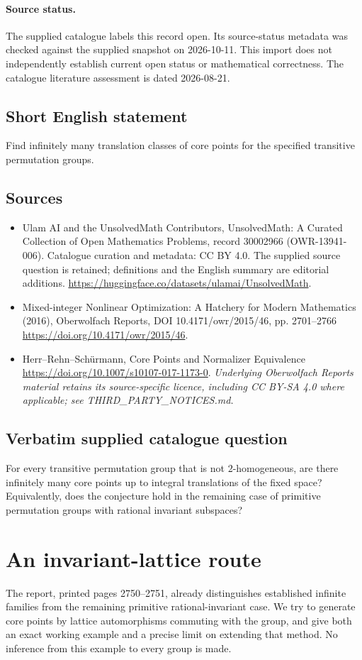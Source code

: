 \documentclass[11pt]{article}
\begin{document}
\paragraph{Source status.}
The supplied catalogue labels this record open. Its source-status metadata was checked against the supplied snapshot on 2026-10-11. This import does not independently establish current open status or mathematical correctness. The catalogue literature assessment is dated 2026-08-21.
\subsection{Short English statement}
Find infinitely many translation classes of core points for the specified transitive permutation groups.
\subsection{Sources}
\begin{itemize}
\item[S1] Ulam AI and the UnsolvedMath Contributors, UnsolvedMath: A Curated Collection of Open Mathematics Problems, record 30002966 (OWR-13941-006). Catalogue curation and metadata: CC BY 4.0. The supplied source question is retained; definitions and the English summary are editorial additions.
\url{https://huggingface.co/datasets/ulamai/UnsolvedMath}.
\item[S2] Mixed-integer Nonlinear Optimization: A Hatchery for Modern Mathematics (2016), Oberwolfach Reports, DOI 10.4171/owr/2015/46, pp. 2701--2766
\url{https://doi.org/10.4171/owr/2015/46}.
\item[S3] Herr--Rehn--Schürmann, Core Points and Normalizer Equivalence
\url{https://doi.org/10.1007/s10107-017-1173-0}.
\textit{Underlying Oberwolfach Reports material retains its source-specific licence, including CC BY-SA 4.0 where applicable; see THIRD\_PARTY\_NOTICES.md.}
\end{itemize}
\subsection{Verbatim supplied catalogue question}
For every transitive permutation group that is not $2$-homogeneous, are there infinitely many core points up to integral translations of the fixed space? Equivalently, does the conjecture hold in the remaining case of primitive permutation groups with rational invariant subspaces?

\section{An invariant-lattice route}
The report, printed pages 2750--2751, already distinguishes established
infinite families from the remaining primitive rational-invariant case.
We try to generate core points by lattice automorphisms commuting with the
group, and give both an exact working example and a precise limit on extending
that method. No inference from this example to every group is made.
\end{document}
